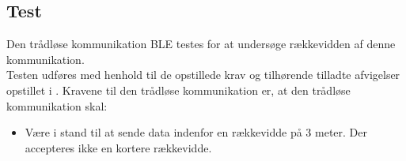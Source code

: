 
\subsection{Test}
Den trådløse kommunikation BLE testes for at undersøge rækkevidden af denne kommunikation. \\
Testen udføres med henhold til de opstillede krav og tilhørende tilladte afvigelser opstillet i . Kravene til den trådløse kommunikation er, at den trådløse kommunikation skal:
\begin{itemize}
	\item Være i stand til at sende data indenfor en rækkevidde på 3 meter. Der accepteres ikke en kortere rækkevidde.
\end{itemize}

